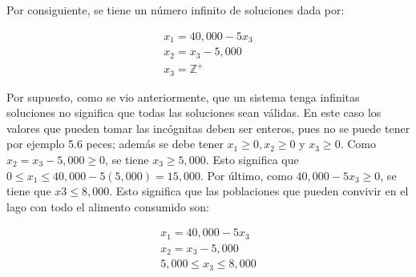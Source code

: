 \documentclass{article}
\begin{document}
Por consiguiente, se tiene un número infinito de soluciones dada por: 

\begin{equation*}
    \begin{aligned}
        x_1 = 40,000 - 5x_3\\
        x_2 = x_3 - 5,000\\
        x_3 = \mathbb{Z}^+
    \end{aligned}
\end{equation*}

Por supuesto, como se vio anteriormente, que un sistema tenga infinitas soluciones no significa que todas las soluciones sean válidas. En este caso los valores que pueden tomar las incógnitas deben ser enteros, pues no se puede tener por ejemplo 5.6 peces; además se debe tener $x_1 \geq 0, x_2 \geq 0$ y $x_3 \geq 0$. Como $x_2 = x_3 - 5,000 \geq 0$, se tiene $x_3 \geq 5,000$. Esto significa que $0 \leq x_1 \leq 40,000 - 5(5,000)= 15,000$. Por último, como $40,000 - 5x_3 \geq 0$, se tiene que $x3 \leq 8,000$. Esto significa que las poblaciones que pueden convivir en el lago con todo el alimento consumido son: 

\begin{equation*}
    \begin{aligned}
        x_1 = 40,000 -5x_3\\
        x_2 = x_3 - 5,000\\
        5,000 \leq x_3 \leq 8,000
    \end{aligned}
\end{equation*}

\cite{DavidC}
\pagebreak

\end{document}
